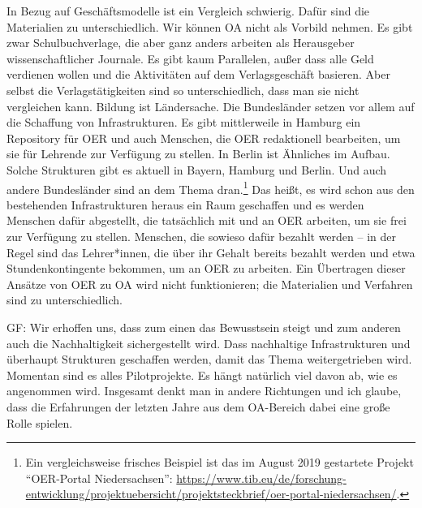 \documentclass[a4paper,
fontsize=11pt,
oneside,
numbers=noperiodatend,
parskip=half-,
bibliography=totoc,
final
]{scrartcl}
\begin{document}
In Bezug auf Geschäftsmodelle ist ein Vergleich schwierig. Dafür sind
die Materialien zu unterschiedlich. Wir können OA nicht als Vorbild
nehmen. Es gibt zwar Schulbuchverlage, die aber ganz anders arbeiten als
Herausgeber wissenschaftlicher Journale. Es gibt kaum Parallelen, außer
dass alle Geld verdienen wollen und die Aktivitäten auf dem
Verlagsgeschäft basieren. Aber selbst die Verlagstätigkeiten sind so
unterschiedlich, dass man sie nicht vergleichen kann. Bildung ist
Ländersache. Die Bundesländer setzen vor allem auf die Schaffung von
Infrastrukturen. Es gibt mittlerweile in Hamburg ein Repository für OER
und auch Menschen, die OER redaktionell bearbeiten, um sie für Lehrende
zur Verfügung zu stellen. In Berlin ist Ähnliches im Aufbau. Solche
Strukturen gibt es aktuell in Bayern, Hamburg und Berlin. Und auch
andere Bundesländer sind an dem Thema dran.\footnote{Ein vergleichsweise
  frisches Beispiel ist das im August 2019 gestartete Projekt
  \enquote{OER-Portal Niedersachsen}:
  \url{https://www.tib.eu/de/forschung-entwicklung/projektuebersicht/projektsteckbrief/oer-portal-niedersachsen/}.}
Das heißt, es wird schon aus den bestehenden Infrastrukturen heraus ein
Raum geschaffen und es werden Menschen dafür abgestellt, die tatsächlich
mit und an OER arbeiten, um sie frei zur Verfügung zu stellen. Menschen,
die sowieso dafür bezahlt werden -- in der Regel sind das Lehrer*innen,
die über ihr Gehalt bereits bezahlt werden und etwa Stundenkontingente
bekommen, um an OER zu arbeiten. Ein Übertragen dieser Ansätze von OER
zu OA wird nicht funktionieren; die Materialien und Verfahren sind zu
unterschiedlich.

GF: Wir erhoffen uns, dass zum einen das Bewusstsein steigt und zum
anderen auch die Nachhaltigkeit sichergestellt wird. Dass nachhaltige
Infrastrukturen und überhaupt Strukturen geschaffen werden, damit das
Thema weitergetrieben wird. Momentan sind es alles Pilotprojekte. Es
hängt natürlich viel davon ab, wie es angenommen wird. Insgesamt denkt
man in andere Richtungen und ich glaube, dass die Erfahrungen der
letzten Jahre aus dem OA-Bereich dabei eine große Rolle spielen.
\end{document}
